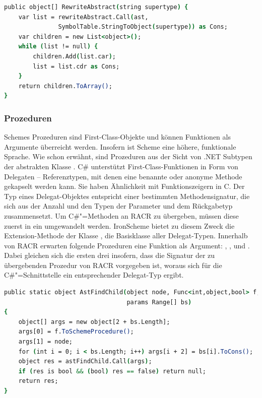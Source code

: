 \begin{lstlisting}[language=csh, caption={Arraykonstruktion in \csh{RewriteAbstract}}, label=csh:rewriteabstract]
public object[] RewriteAbstract(string supertype) {
	var list = rewriteAbstract.Call(ast,
			   SymbolTable.StringToObject(supertype)) as Cons;
	var children = new List<object>();
	while (list != null) {
		children.Add(list.car);
		list = list.cdr as Cons;
	}
	return children.ToArray();
}
\end{lstlisting}

\subsubsection{Prozeduren}\label{prozeduren}

Schemes Prozeduren sind First-Class-Objekte und können Funktionen als Argumente überreicht werden. Insofern ist Scheme eine höhere, funktionale Sprache. Wie schon erwähnt, sind Prozeduren aus der Sicht von .NET Subtypen der abstrakten Klasse . C\# unterstützt First-Class-Funktionen in Form von Delegaten – Referenztypen, mit denen eine benannte oder anonyme Methode gekapselt werden kann. Sie haben Ähnlichkeit mit Funktionszeigern in C. Der Typ eines Delegat-Objektes entspricht einer bestimmten Methodensignatur, die sich aus der Anzahl und den Typen der Parameter und dem Rückgabetyp zusammensetzt. Um C\#"=Methoden an RACR zu übergeben, müssen diese zuerst in ein  umgewandelt werden. IronScheme bietet zu diesem Zweck die Extension-Methode  der Klasse , die Basisklasse aller Delegat-Typen. Innerhalb von RACR erwarten folgende Prozeduren eine Funktion als Argument: , ,  und . Dabei gleichen sich die ersten drei insofern, dass die Signatur der zu übergebenden Prozedur von RACR vorgegeben ist, woraus sich für die C\#"=Schnittstelle ein entsprechender Delegat-Typ ergibt.

\begin{lstlisting}[language=csh, caption={Delegat-Parameter in \csh{AstFindChild}}, label=csh:astfindchild]
public static object AstFindChild(object node, Func<int,object,bool> f,
								  params Range[] bs)
{
	object[] args = new object[2 + bs.Length];
	args[0] = f.ToSchemeProcedure();
	args[1] = node;
	for (int i = 0; i < bs.Length; i++) args[i + 2] = bs[i].ToCons();
	object res = astFindChild.Call(args);
	if (res is bool && (bool) res == false) return null;
	return res;
}
\end{lstlisting}

